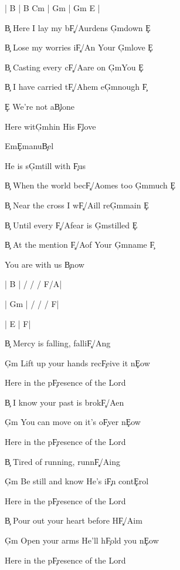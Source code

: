 \documentclass[9pt]{extarticle}
\begin{document}
\bsong

\bi
| B | B C\s m | G\s m | G\s m E |
\ei

\bv
\c{B} Here I lay my b\c{F\s /A\s }urdens \c{G\s m}down \c{E}

\c{B} Lose my worries i\c{F\s /A\s }n Your \c{G\s m}love \c{E}

\c{B} Casting every c\c{F\s /A\s }are on \c{G\s m}You \c{E}

\c{B} I have carried t\c{F\s /A\s }hem e\c{G\s m}nough \c{F\s }
\ev

\bc
\c{E} We're not a\c{B}lone

Here wit\c{G\s m}hin His \c{F\s }love

Em\c{E}manu\c{B}el

He is s\c{G\s m}till with \c{F\s }us
\ec

\bv
\c{B} When the world bec\c{F\s /A\s }omes too \c{G\s m}much \c{E}

\c{B} Near the cross I w\c{F\s /A\s }ill re\c{G\s m}main \c{E}

\c{B} Until every \c{F\s /A\s }fear is \c{G\s m}stilled \c{E}

\c{B} At the mention \c{F\s /A\s }of Your \c{G\s m}name \c{F\s }
\ev


\bt
You are with us \c{B}now
\et

\bin
| B |  / / / F\s /A\s   |

| G\s m |  / / / F\s   |

| E | F\s  |
\ein

\bb[2]
\c{B} Mercy is falling, falli\c{F\s /A\s }ng

\c{G\s m} Lift up your hands rec\c{F\s }eive it n\c{E}ow

Here in the p\c{F\s }resence of the Lord
\eb

\bb[2]
\c{B} I know your past is brok\c{F\s /A\s }en

\c{G\s m} You can move on it's o\c{F\s }ver n\c{E}ow

Here in the p\c{F\s }resence of the Lord
\eb

\bb
\c{B} Tired of running, runn\c{F\s /A\s }ing

\c{G\s m} Be still and know He's i\c{F\s }n cont\c{E}rol

Here in the p\c{F\s }resence of the Lord
\eb

\bb
\c{B} Pour out your heart before H\c{F\s /A\s }im

\c{G\s m} Open your arms He'll h\c{F\s }old you n\c{E}ow

Here in the p\c{F\s }resence of the Lord
\eb


\esong
\end{document}
